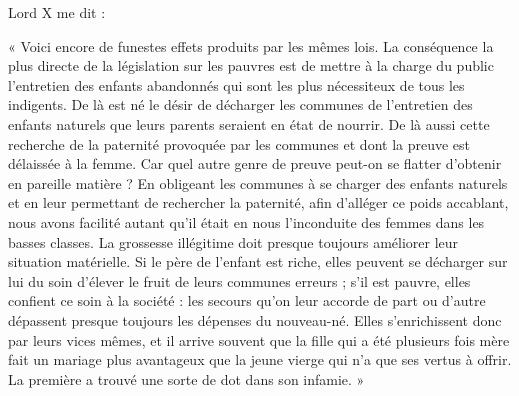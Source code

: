 \documentclass[french,twoside]{book} %
\newenvironment{quoteblock}%
  {\begin{quoting}}
  {\end{quoting}}
\newenvironment{quotebar}{%
    \def\FrameCommand{{\color{rubric!10!}\vrule width 0.5em} \hspace{0.9em}}%
    \def\OuterFrameSep{\itemsep} %
    \MakeFramed {\advance\hsize-\width \FrameRestore}
  }%
  {%
    \endMakeFramed
  }
\renewenvironment{quoteblock}%
  {%
    \savenotes
    \setstretch{0.9}
    \begin{quotebar}
  }
  {%
    \end{quotebar}
    \spewnotes
  }
\begin{document}
\noindent Lord X me dit :\par

\begin{quoteblock}
\noindent « Voici encore de funestes effets produits par les mêmes lois. La conséquence la plus directe de la législation sur les pauvres est de mettre à la charge du public l’entretien des enfants abandonnés qui sont les plus nécessiteux de tous les indigents. De là est né le désir de décharger les communes de l’entretien des enfants naturels que leurs parents seraient en état de nourrir. De là aussi cette recherche de la paternité provoquée par les communes et dont la preuve est délaissée à la femme. Car quel autre genre de preuve peut-on se flatter d’obtenir en pareille matière ? En obligeant les communes à se charger des enfants naturels et en leur permettant de rechercher la paternité, afin d’alléger ce poids accablant, nous avons facilité autant qu’il était en nous l’inconduite des femmes dans les basses classes. La grossesse illégitime doit presque toujours améliorer leur situation matérielle. Si le père de l’enfant est riche, elles peuvent se décharger sur lui du soin d’élever le fruit de leurs communes erreurs ; s’il est pauvre, elles confient ce soin à la société : les secours qu’on leur accorde de part ou d’autre dépassent presque toujours les dépenses du nouveau-né. Elles s’enrichissent donc par leurs vices mêmes, et il arrive souvent que la fille qui a été plusieurs fois mère fait un mariage plus avantageux que la jeune vierge qui n’a que ses vertus à offrir. La première a trouvé une sorte de dot dans son infamie. »
\end{quoteblock}
\end{document}
